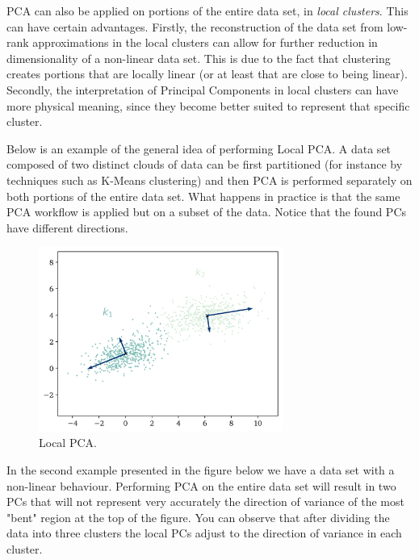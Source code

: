 \documentclass[10pt,twocolumn]{article}
\begin{document}
PCA can also be applied on portions of the entire data set, in \textit{local clusters}. This can have certain advantages. Firstly, the reconstruction of the data set from low-rank approximations in the local clusters can allow for further reduction in dimensionality of a non-linear data set. This is due to the fact that clustering creates portions that are locally linear (or at least that are close to being linear). Secondly, the interpretation of Principal Components in local clusters can have more physical meaning, since they become better suited to represent that specific cluster.

Below is an example of the general idea of performing Local PCA. A data set composed of two distinct clouds of data can be first partitioned (for instance by techniques such as K-Means clustering) and then PCA is performed separately on both portions of the entire data set. What happens in practice is that the same PCA workflow is applied but on a subset of the data. Notice that the found PCs have different directions.

\begin{figure}[H]
\centering\includegraphics[width=8cm]{lpca-on-cloud-data.png}
\caption{Local PCA.}
\label{fig:local-pca}
\end{figure}

In the second example presented in the figure below we have a data set with a non-linear behaviour. Performing PCA on the entire data set will result in two PCs that will not represent very accurately the direction of variance of the most "bent" region at the top of the figure. You can observe that after dividing the data into three clusters the local PCs adjust to the direction of variance in each cluster.
\end{document}
